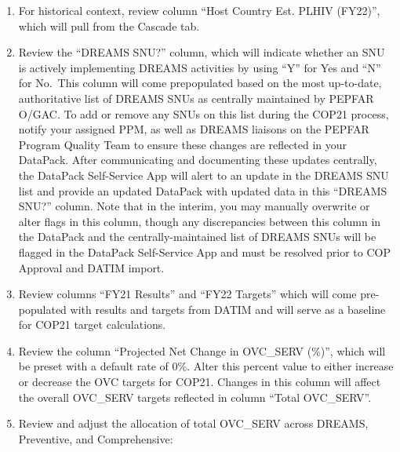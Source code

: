 \documentclass[
  openany]{book}
\begin{document}
\begin{enumerate}
\def\labelenumi{\arabic{enumi}.}
\item
  For historical context, review column ``Host Country Est. PLHIV
  (FY22)'', which will pull from the Cascade tab.
\item
  Review the ``DREAMS SNU?'' column, which will indicate whether an SNU
  is actively implementing DREAMS activities by using ``Y'' for Yes and
  ``N'' for No.~This column will come prepopulated based on the most
  up-to-date, authoritative list of DREAMS SNUs as centrally
  maintained by PEPFAR O/GAC. To add or remove any SNUs on this list
  during the COP21 process, notify your assigned PPM, as well as
  DREAMS liaisons on the PEPFAR Program Quality Team to ensure these
  changes are reflected in your DataPack. After communicating and
  documenting these updates centrally, the DataPack Self-Service App
  will alert to an update in the DREAMS SNU list and provide an
  updated DataPack with updated data in this ``DREAMS SNU?'' column.
  Note that in the interim, you may manually overwrite or alter flags
  in this column, though any discrepancies between this column in the
  DataPack and the centrally-maintained list of DREAMS SNUs will be
  flagged in the DataPack Self-Service App and must be resolved prior
  to COP Approval and DATIM import.
\item
  Review columns ``FY21 Results'' and ``FY22 Targets'' which will come
  pre-populated with results and targets from DATIM and will serve as
  a baseline for COP21 target calculations.
\item
  Review the column ``Projected Net Change in OVC\_SERV (\%)'', which will
  be preset with a default rate of 0\%. Alter this percent value to
  either increase or decrease the OVC targets for COP21. Changes in
  this column will affect the overall OVC\_SERV targets reflected in
  column ``Total OVC\_SERV''.
\item
  Review and adjust the allocation of total OVC\_SERV across DREAMS,
  Preventive, and Comprehensive:


\end{enumerate}
\end{document}
